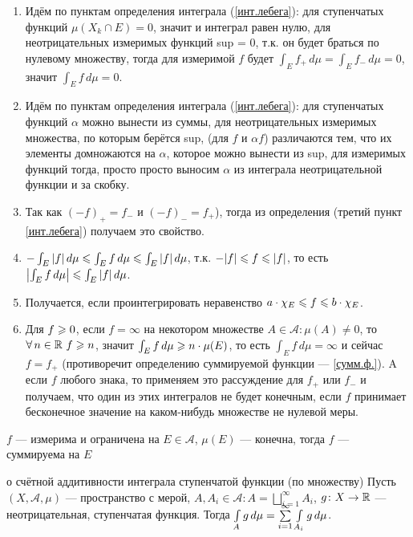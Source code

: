 \begin{zam}[https://www.youtube.com/live/fVyBKDoy3EM?si=LgENIvc4Pq6wo4Vq&t=7600]
\begin{enumerate}
	\item Идём по пунктам определения интеграла (\ref{инт.лебега}): для ступенчатых функций $\mu(X_k \cap E) = 0$, значит и интеграл равен нулю, для неотрицательных измеримых функций sup = 0, т.к. он будет браться по нулевому множеству, тогда для измеримой $f$ будет $\int_E f_+ \, d\mu = \int_E f_- \, d\mu = 0$, значит $\int_E f \, d \mu = 0$.
	
	\item Идём по пунктам определения интеграла (\ref{инт.лебега}): для ступенчатых функций $\alpha$ можно вынести из суммы, для неотрицательных измеримых множества, по которым берётся sup, (для $f$ и $\alpha f$) различаются тем, что их элементы домножаются на $\alpha$, которое можно вынести из sup, для измеримых функций тогда, просто просто выносим $\alpha$ из интеграла неотрицательной функции и за скобку.
	
	\item Так как $(-f)_+ = f_-$ и $(-f)_- = f_+$), тогда из определения (третий пункт \ref{инт.лебега}) получаем это свойство.
	
	\item $-\int_E |f| \, d\mu \leqslant \int_E f \, d\mu \leqslant \int_E |f| \, d\mu$, т.к. $-|f| \leqslant f \leqslant |f|$, то есть $\left| \int_E f \, d\mu \right| \leqslant \int_E |f| \, d\mu$.
	
	\item Получается, если проинтегрировать неравенство $a\cdot \chi_E \leqslant f \leqslant b \cdot \chi_E$.
	
	\item Для $f \geqslant 0$, если $f = \infty$ на некотором множестве $A \in \mathcal A : \mu(A) \ne 0$, то $\forall \, n \in \mathbb R\ f \geqslant n$, значит $\int_E f \,d\mu\geqslant n\cdot\mu(E)$, то есть $\int_E f \,d\mu = \infty$ и сейчас $f = f_+$ (противоречит определению суммируемой функции --- \ref{сумм.ф.}). A если $f$ любого знака, то применяем это рассуждение для $f_+$ или $f_-$ и получаем, что один из этих интегралов не будет конечным, если $f$ принимает бесконечное значение на каком-нибудь множестве не нулевой меры.
\end{enumerate}
\end{zam}

\begin{slv}[https://www.youtube.com/live/fVyBKDoy3EM?si=sETo23yD0_fs-eX7&t=8268]
	$f$ --- измерима и ограничена на $E \in \mathcal A$, $\mu(E)$ --- конечна, тогда $f$ --- суммируема на $E$
\end{slv}

\begin{lem}[https://www.youtube.com/live/fVyBKDoy3EM?si=EMYfzcqXvHHocmli&t=8683]{о счётной аддитивности интеграла ступенчатой функции (по множеству)}\label{адд.инт.ступ.}%
	Пусть $(X, \mathcal A, \mu)$ --- пространство с мерой, $A, A_i \in \mathcal A : A = \bigsqcup\limits_{i = 1}^\infty A_i$, $g \colon X \to \mathbb R$ --- неотрицательная, ступенчатая функция. Тогда $\int\limits_A g\, d\mu = \raisebox{0pt}[0pt]{$\sum\limits_{i = 1}^\infty$} \int\limits_{A_i}g\,d\mu$.
\end{lem}

